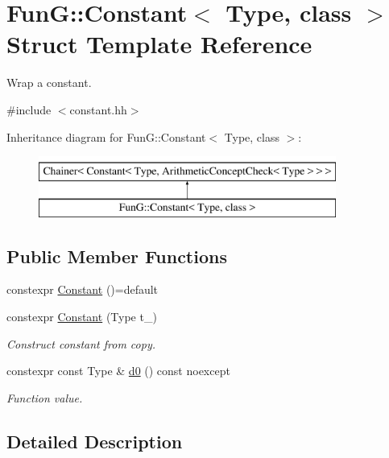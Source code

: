 \hypertarget{structFunG_1_1Constant}{}\section{FunG\+:\+:Constant$<$ Type, class $>$ Struct Template Reference}
\label{structFunG_1_1Constant}


Wrap a constant.  




{\ttfamily \#include $<$constant.\+hh$>$}

Inheritance diagram for FunG\+:\+:Constant$<$ Type, class $>$\+:\begin{figure}[H]
\begin{center}
\leavevmode
\includegraphics[height=2.000000cm]{structFunG_1_1Constant}
\end{center}
\end{figure}
\subsection*{Public Member Functions}
\begin{DoxyCompactItemize}
\item 
constexpr \hyperlink{structFunG_1_1Constant_a278d28a1015016d076389b89a43bf118}{Constant} ()=default
\item 
constexpr \hyperlink{structFunG_1_1Constant_a24482c93ea4fe192f4c1a062c5b2d8a1}{Constant} (Type t\+\_\+)
\begin{DoxyCompactList}\small\item\em Construct constant from copy. \end{DoxyCompactList}\item 
constexpr const Type \& \hyperlink{structFunG_1_1Constant_a1b05280c971ecf127e61b8b52ff6b570}{d0} () const noexcept
\begin{DoxyCompactList}\small\item\em Function value. \end{DoxyCompactList}\end{DoxyCompactItemize}


\subsection{Detailed Description}
